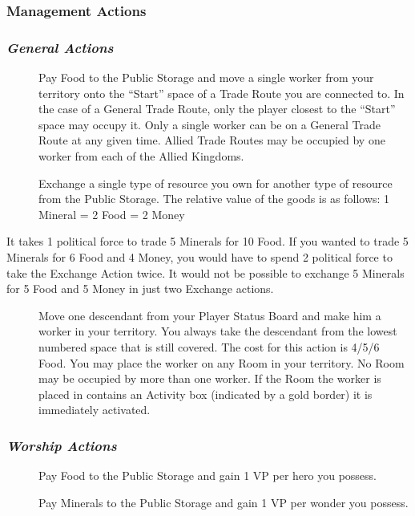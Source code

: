 \documentclass[10pt,twocolumn]{article}
\begin{document}
\subsubsection{Management Actions}
\subsubsection*{\textit{General Actions}}
\begin{description}
\item[] Pay  Food to the Public Storage and move a single worker from your territory onto the ``Start'' space of a Trade Route you are connected to. In the case of a General Trade Route, only the player closest to the ``Start'' space may occupy it. Only a single worker can be on a General Trade Route at any given time. Allied Trade Routes may be occupied by one worker from each of the Allied Kingdoms.

\item[] Exchange a single type of resource you own for another type of resource from the Public Storage. The relative value of the goods is as follows: 1 Mineral = 2 Food = 2 Money
\end{description}
\begin{BoxExample}It takes 1 political force to trade 5 Minerals for 10 Food. If you wanted to trade 5 Minerals for 6 Food and 4 Money, you would have to spend 2 political force to take the Exchange Action twice. It would not be possible to exchange 5 Minerals for 5 Food and 5 Money in just two Exchange actions.\end{BoxExample}
\begin{description}
\item[] Move one descendant from your Player Status Board and make him a worker in your territory. You always take the descendant from the lowest numbered space that is still covered. The cost for this action is {4/5/6} Food. You may place the worker on any Room in your territory. No Room may be occupied by more than one worker. If the Room the worker is placed in contains an Activity box (indicated by a gold border) it is immediately activated.
\end{description}

\subsubsection*{\textit{Worship Actions}}
\begin{description}
\item[] Pay  Food to the Public Storage and gain 1 VP per hero you possess.
\item[] Pay  Minerals to the Public Storage and gain 1 VP per wonder you possess.
\end{description}
\end{document}
